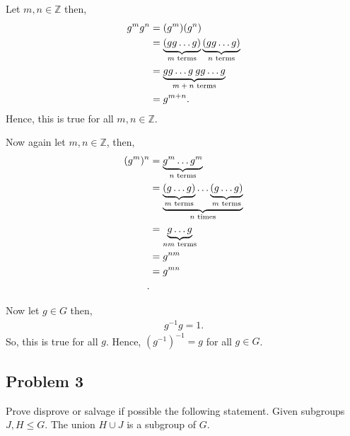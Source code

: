 \begin{solution}

  Let \( m,n \in \mathbb{Z}  \) then,
 \begin{align*}
   g^{m}g^{n} &= (g^{m})(g^{n}) \\
    &= \underbrace{(gg\ldots g)}_{\text{\( m \) terms}} \underbrace{\left( gg\ldots g \right)}_{\text{\( n \) terms}} \\
    &= \underbrace{gg\ldots g \: gg\ldots g}_{\text{\( m+n \) terms}} \\
    &= g^{m+n}
 .\end{align*} 
 Hence, this is true for all \( m,n \in \mathbb{Z} \).

 Now again let \( m,n \in \mathbb{Z} \), then,
 \begin{align*}
   (g^{m})^{n} &= \underbrace{g^{m} \ldots g^{m}}_{\text{\( n \) terms}}\\
               &= \underbrace{\underbrace{\left( g\ldots g \right)}_{\text{\( m \) terms}} \ldots \underbrace{\left( g\ldots g \right)}_{\text{\( m \) terms}}}_{\text{\( n \) times}}  \\
               &=  \underbrace{g\ldots g}_{\text{\( nm \) terms}} \\
               &= g^{nm}\\
               &= g^{mn} \\
  .\end{align*}
\end{solution}

Now let \( g \in G \) then,
\begin{align*}
  g^{-1} g = 1
.\end{align*}
So, this is true for all \( g \).
Hence, \( (g^{-1})^{-1} = g\) for all \( g \in G \).

\subsection{Problem 3}
Prove disprove or salvage if possible the following statement.
Given subgroups \( J, H \le G \). The union \( H \cup J \) is a subgroup of \( G \).

